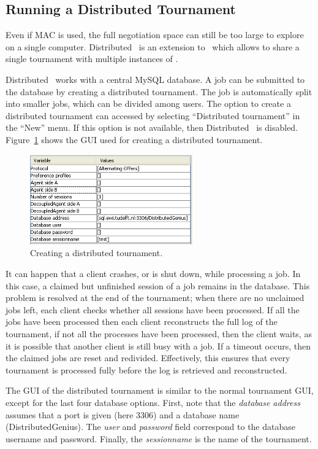 \documentclass[]{article}
\begin{document}
\subsection{Running a Distributed Tournament}
Even if MAC is used, the full negotiation space can still be too large to explore on a single computer. Distributed \Genius ~is an extension to \Genius ~which allows to share a single tournament with multiple instances of \Genius.

Distributed \Genius ~works with a central MySQL database. A job can be submitted to the database by creating a distributed tournament. The job is automatically split into smaller jobs, which can be divided among users. The option to create a distributed tournament can accessed by selecting ``Distributed tournament'' in the ``New'' menu. If this option is not available, then Distributed \Genius ~is disabled. Figure~\ref{fig:dtsettings} shows the GUI used for creating a distributed tournament.

\begin{figure}[h!] 
	\center
	\includegraphics[width=7cm]{media/Decoupled_DTsettings.png}
	\caption{Creating a distributed tournament.}
	\label{fig:dtsettings}
\end{figure}

It can happen that a client crashes, or is shut down, while processing a job. In this case, a claimed but unfinished session of a job remains in the database. This problem is resolved at the end of the tournament; when there are no unclaimed jobs left, each client checks whether all sessions have been processed.  If all the jobs have been processed then each client reconstructs the full log of the tournament, if not all the processes have been processed, then the client waits, as it is possible that another client is still busy with a job. If a timeout occurs, then the claimed jobs are reset and redivided. Effectively, this ensures that every tournament is processed fully before the log is retrieved and reconstructed.

The GUI of the distributed tournament is similar to the normal tournament GUI, except for the last four database options. First, note that the \textit{database address} assumes that a port is given (here 3306) and a database name (DistributedGenius). The \textit{user} and \textit{password} field correspond to the database username and password. Finally, the \textit{sessionname} is the name of the tournament.
\end{document}
